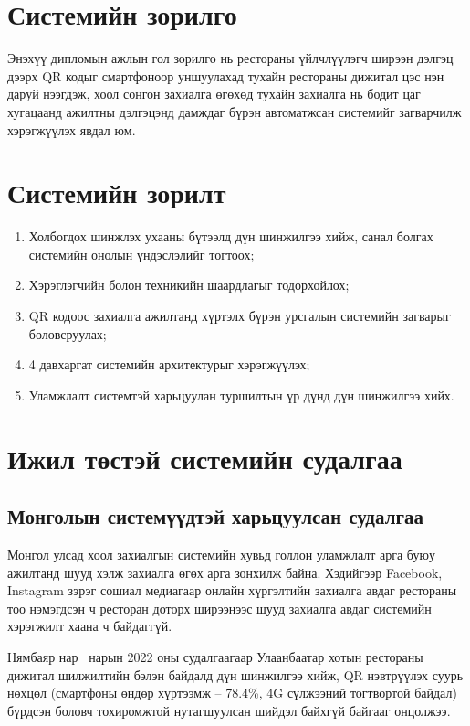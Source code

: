 \section{Системийн зорилго}

Энэхүү дипломын ажлын гол зорилго нь рестораны үйлчлүүлэгч ширээн дэлгэц дээрх QR
кодыг смартфоноор уншуулахад тухайн рестораны дижитал цэс нэн даруй нээгдэж, хоол
сонгон захиалга өгөхөд тухайн захиалга нь бодит цаг хугацаанд ажилтны дэлгэцэнд
дамждаг бүрэн автоматжсан системийг загварчилж хэрэгжүүлэх явдал юм.

\section{Системийн зорилт}

\begin{enumerate}[leftmargin=*]
  \item Холбогдох шинжлэх ухааны бүтээлд дүн шинжилгээ хийж, санал болгах системийн
        онолын үндэслэлийг тогтоох;
  \item Хэрэглэгчийн болон техникийн шаардлагыг тодорхойлох;
  \item QR кодоос захиалга ажилтанд хүртэлх бүрэн урсгалын системийн загварыг
        боловсруулах;
  \item 4 давхаргат системийн архитектурыг хэрэгжүүлэх;
  \item Уламжлалт системтэй харьцуулан туршилтын үр дүнд дүн шинжилгээ хийх.
\end{enumerate}

\section{Ижил төстэй системийн судалгаа}

\subsection{Монголын системүүдтэй харьцуулсан судалгаа}

Монгол улсад хоол захиалгын системийн хувьд голлон уламжлалт арга буюу ажилтанд
шууд хэлж захиалга өгөх арга зонхилж байна. Хэдийгээр Facebook, Instagram зэрэг сошиал медиагаар
онлайн хүргэлтийн захиалга авдаг рестораны тоо нэмэгдсэн ч ресторан доторх ширээнээс
шууд захиалга авдаг системийн хэрэгжилт хаана ч байдаггүй.

Нямбаяр нар~\cite{nyambayar2022} нарын 2022 оны судалгаагаар Улаанбаатар хотын
рестораны дижитал шилжилтийн бэлэн байдалд дүн шинжилгээ хийж, QR нэвтрүүлэх
суурь нөхцөл (смартфоны өндөр хүртээмж -- 78.4\%, 4G сүлжээний тогтвортой байдал)
бүрдсэн боловч тохиромжтой нутагшуулсан шийдэл байхгүй байгааг онцолжээ.

